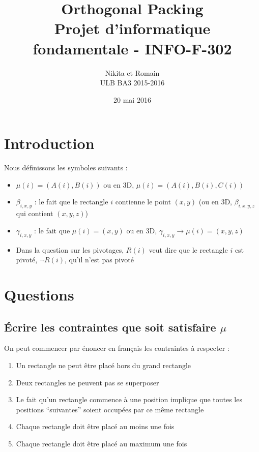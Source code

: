 \documentclass[a4paper]{article}
\title{
    Orthogonal Packing\\
    \small Projet d'informatique fondamentale - INFO-F-302
}
\author{
    Nikita \bsc{Marchant} et Romain \bsc{Fontaine}\\
    ULB BA3 2015-2016
}
\date{20 mai 2016}
\begin{document}
\maketitle
\tableofcontents

\section{Introduction}

Nous définissons les symboles suivants :
\begin{itemize}
  \item $\mu(i) = (A(i), B(i))$ ou en 3D, $\mu(i) = (A(i), B(i), C(i))$
  \item $\beta_{i, x, y}$ : le fait que le rectangle $i$ contienne le point $(x, y)$ (ou en 3D, $\beta_{i, x, y, z}$ qui contient $(x, y, z)$)
  \item $\gamma_{i, x, y}$ : le fait que $\mu(i) = (x, y)$ ou en 3D, $\gamma_{i, x, y} \rightarrow \mu(i) = (x, y, z)$
  \item Dans la question sur les pivotages, $R(i)$ veut dire que le rectangle $i$ est pivoté, $\lnot R(i)$, qu'il n'est pas pivoté
\end{itemize}

\section{Questions}
\subsection{Écrire les contraintes que soit satisfaire $\mu$}

On peut commencer par énoncer en français les contraintes à respecter :
\begin{enumerate}
  \item Un rectangle ne peut être placé hors du grand rectangle
  \item Deux rectangles ne peuvent pas se superposer
  \item Le fait qu'un rectangle commence à une position implique que toutes les positions ``suivantes'' soient occupées par ce même rectangle
  \item Chaque rectangle doit être placé au moins une fois
  \item Chaque rectangle doit être placé au maximum une fois
\end{enumerate}
\vspace{1em}
\end{document}
